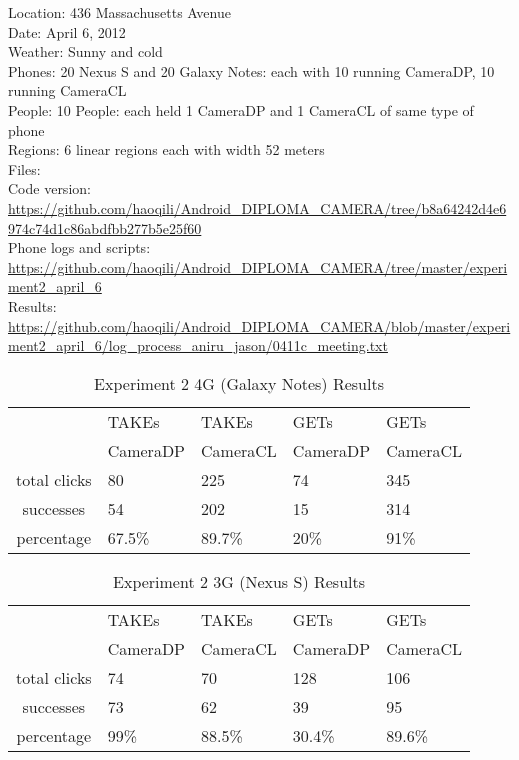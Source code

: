 Location: 436 Massachusetts Avenue\\
Date: April 6, 2012\\
Weather: Sunny and cold\\
Phones: 20 Nexus S and 20 Galaxy Notes: each with 10 running CameraDP, 10 running CameraCL\\
People: 10 People: each held 1 CameraDP and 1 CameraCL of same type of phone\\
Regions: 6 linear regions each with width 52 meters\\
Files:\\
Code version: {\url{https://github.com/haoqili/Android_DIPLOMA_CAMERA/tree/b8a64242d4e6974c74d1c86abdfbb277b5e25f60}}\\
Phone logs and scripts: {\url{https://github.com/haoqili/Android_DIPLOMA_CAMERA/tree/master/experiment2_april_6}}\\ 
Results: {\url{https://github.com/haoqili/Android_DIPLOMA_CAMERA/blob/master/experiment2_april_6/log_process_aniru_jason/0411c_meeting.txt}}\\

\begin{table}[htb]
\begin{scriptsize} 
\caption{Experiment 2 4G (Galaxy Notes) Results} 
\label{table:exp-2-4g-results}
 \begin{center}
 \begin{tabular}{| c | p{1.5cm} | p{1.5cm} | p{1.5cm} | p{1.4cm} |}
  \hline
  & TAKEs & TAKEs & GETs & GETs \\
  & CameraDP & CameraCL & CameraDP & CameraCL \\
  \hline
  total clicks & 80 & 225 & 74 & 345 \\
  \hline
  successes & 54 & 202 & 15 & 314 \\
  \hline
  percentage & 67.5\% & 89.7\% & 20\% & 91\% \\
  \hline
  \end{tabular}
  \end{center}
\end{scriptsize}
\end{table}

\begin{table}[htb]
\begin{scriptsize} 
\caption{Experiment 2 3G (Nexus S) Results} 
\label{table:exp-2-3g-results}
 \begin{center}
 \begin{tabular}{| c | p{1.5cm} | p{1.5cm} | p{1.5cm} | p{1.4cm} |}
  \hline
  & TAKEs & TAKEs & GETs & GETs \\
  & CameraDP & CameraCL & CameraDP & CameraCL \\
  \hline
  total clicks & 74 & 70 & 128 & 106 \\
  \hline
  successes & 73 & 62 & 39 & 95 \\
  \hline
  percentage & 99\% & 88.5\% & 30.4\% & 89.6\% \\
  \hline
  \end{tabular}
  \end{center}
\end{scriptsize}
\end{table}

